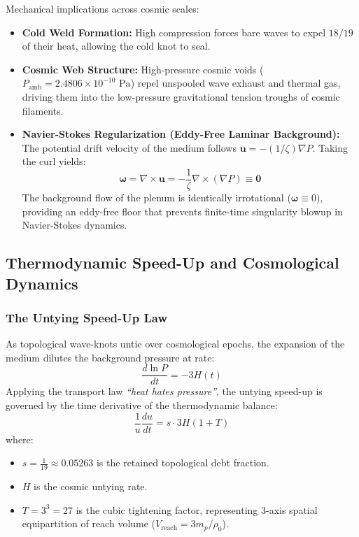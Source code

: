 \documentclass[11pt,a4paper]{article}
\begin{document}
Mechanical implications across cosmic scales:
\begin{itemize}
    \item \textbf{Cold Weld Formation:} High compression forces bare waves to expel $18/19$ of their heat, allowing the cold knot to seal.
    \item \textbf{Cosmic Web Structure:} High-pressure cosmic voids ($P_{\text{amb}} = 2.4806 \times 10^{-10}\text{ Pa}$) repel unspooled wave exhaust and thermal gas, driving them into the low-pressure gravitational tension troughs of cosmic filaments.
    \item \textbf{Navier-Stokes Regularization (Eddy-Free Laminar Background):} The potential drift velocity of the medium follows $\mathbf{u} = -(1/\zeta)\nabla P$. Taking the curl yields:
    \begin{equation}
    \boldsymbol{\omega} = \nabla \times \mathbf{u} = -\frac{1}{\zeta} \nabla \times (\nabla P) \equiv \mathbf{0}
    \label{eq:vorticity_zero}
    \end{equation}
    The background flow of the plenum is identically irrotational ($\boldsymbol{\omega} \equiv 0$), providing an eddy-free floor that prevents finite-time singularity blowup in Navier-Stokes dynamics.
\end{itemize}

\subsection{Thermodynamic Speed-Up and Cosmological Dynamics}
\label{subsec:thermodynamic_speed_up}

\subsubsection{The Untying Speed-Up Law}

As topological wave-knots untie over cosmological epochs, the expansion of the medium dilutes the background pressure at rate:
\begin{equation}
\frac{d\ln P}{dt} = -3 H(t)
\end{equation}
Applying the transport law \textit{``heat hates pressure''}, the untying speed-up is governed by the time derivative of the thermodynamic balance:
\begin{equation}
\frac{1}{u}\frac{du}{dt} = s \cdot 3H(1 + T)
\label{eq:speed_up_balance}
\end{equation}
where:
\begin{itemize}
    \item $s = \frac{1}{19} \approx 0.05263$ is the retained topological debt fraction.
    \item $H$ is the cosmic untying rate.
    \item $T = 3^3 = 27$ is the cubic tightening factor, representing 3-axis spatial equipartition of reach volume ($V_{\text{reach}} = 3m_p / \rho_0$).
\end{itemize}
\end{document}
